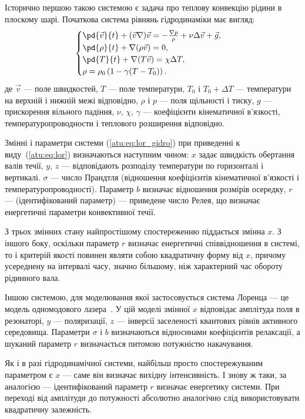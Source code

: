 Історично першою такою системою є задача про теплову
конвекцію рідини в плоскому шарі.
%
Початкова система рівнянь гідродинаміки має вигляд:
%
%
\begin{equation}
\begin{cases}
  \pd{\vec{v}}{t} + ( \vec{v} \nabla ) \vec{v} = - \frac{\nabla p}{\rho} + \nu \Delta \vec{v} + \vec{g}, \\
  \pd{\rho}{t} + \nabla ( \rho \vec{v} ) = 0 , \\
  \pd{T}{t} +\nabla ( T \vec{v} ) = \chi \Delta T , \\
  \rho = \rho_0 \left( 1 - \gamma (T - T_0) \right) .
\end{cases}
\label{atu:eq:lor_gidro}
\end{equation}
%
де
$ \Vec{v} $ --- поле швидкостей,
$ T $ --- поле температури,
$ T_0 $ і $ T_0 + \Delta T $ --- температури на верхній і нижній межі відповідно,
$ \rho $ і $ p $ --- поля щільності і тиску,
$ g $ --- прискорення вільного падіння,
$ \nu $,
$ \chi $,
$ \gamma $ --- коефіцієнти кінематичної в'язкості,
температуропроводности і теплового розширення відповідно.

Змінні і параметри системи (\ref{atu:eq:lor_gidro}) при приведенні к виду~(\ref{atu:eq:lor})
визначаються наступним чином:
$x$ задає швидкість обертання валів течії,
$y$, $z$ --- відповідають розподілу температури по горизонталі і вертикалі.
$\sigma$ --- число Прандтля (відношення коефіцієнтів кінематичної в'язкості і температуропроводності).
Параметр $b$ визначає відношення розмірів осередку,
$r$ --- (ідентифікований параметр) --- приведене число Релея, що визначає енергетичні параметри
конвективної течії.

З трьох змінних стану найпростішому спостереженню піддається змінна $x$.
З іншого боку, оскільки параметр $r$ визначає енергетичні співвідношення в
системі, то і критерій якості повинен являти собою квадратичну форму від $x$,
причому усереднену на інтервалі часу, значно більшому, ніж характерний час
обороту рідинного вала.

Іншою системою, для моделювання якої застосовується система
Лоренца --- це модель одномодового лазера~\cite{andrianov_laser}. У цій
моделі змінної
$ x $ відповідає амплітуда поля в резонаторі,
$ y $ --- поляризації,
$ z $ --- інверсії заселеності квантових рівнів активного середовища. Параметри
$ \sigma $ і $ b $ визначаються відносинами коефіцієнтів релаксації, а шуканий
параметр
$r$ визначається питомою потужністю накачування.

Як і в разі гідродинамічної системи, найбільш просто
спостережуваним параметром є
$x$ --- саме він визначає вихідну інтенсивність. І знову ж таки,
за аналогією --- ідентифікований параметр
$r$ визначає енергетику системи. При переході від амплітуди
до потужності абсолютно аналогічно слід використовувати
квадратичну залежність.

